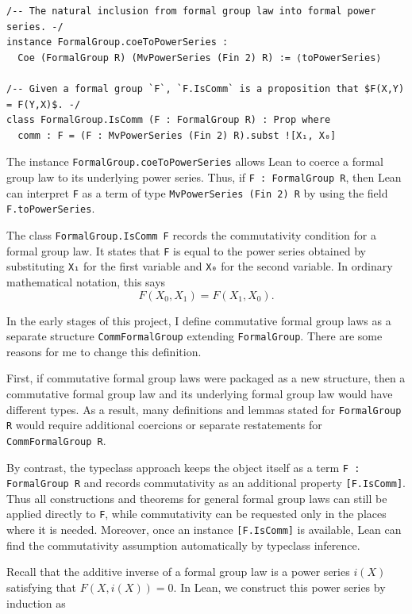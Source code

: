 \begin{lstlisting}
/-- The natural inclusion from formal group law into formal power series. -/
instance FormalGroup.coeToPowerSeries :
  Coe (FormalGroup R) (MvPowerSeries (Fin 2) R) := ⟨toPowerSeries⟩

/-- Given a formal group `F`, `F.IsComm` is a proposition that $F(X,Y) = F(Y,X)$. -/
class FormalGroup.IsComm (F : FormalGroup R) : Prop where
  comm : F = (F : MvPowerSeries (Fin 2) R).subst ![X₁, X₀]
\end{lstlisting}

The instance \lstinline|FormalGroup.coeToPowerSeries| allows Lean to
coerce a formal group law to its underlying power series.  Thus, if
\lstinline|F : FormalGroup R|, then Lean can interpret \lstinline|F| as
a term of type \lstinline|MvPowerSeries (Fin 2) R| by using the field
\lstinline|F.toPowerSeries|.

The class \lstinline|FormalGroup.IsComm F| records the commutativity
condition for a formal group law.  It states that \lstinline|F| is equal
to the power series obtained by substituting \lstinline|X₁| for the first
variable and \lstinline|X₀| for the second variable.  In ordinary
mathematical notation, this says
\[
  F(X_0, X_1) = F(X_1, X_0).
\]

In the early stages of this project,
I define commutative formal group laws as a separate structure
\lstinline|CommFormalGroup| extending \lstinline|FormalGroup|.
There are some reasons for me to change this definition.

First, if commutative formal group laws were packaged
as a new structure, then a commutative formal group law and its underlying
formal group law would have different types.  As a result, many
definitions and lemmas stated for \lstinline|FormalGroup R| would require
additional coercions or separate restatements for
\lstinline|CommFormalGroup R|.

By contrast, the typeclass approach keeps the object itself as a term
\lstinline|F : FormalGroup R| and records commutativity as an additional
property \lstinline|[F.IsComm]|.  Thus all constructions and theorems for
general formal group laws can still be applied directly to \lstinline|F|,
while commutativity can be requested only in the places where it is
needed. Moreover, once an instance \lstinline|[F.IsComm]| is available, Lean can
find the commutativity assumption automatically by typeclass inference.

Recall that the additive inverse of a formal group law is a power series
$i(X)$ satisfying that $F(X, i(X)) = 0$. In Lean, we construct this power series
by induction as

